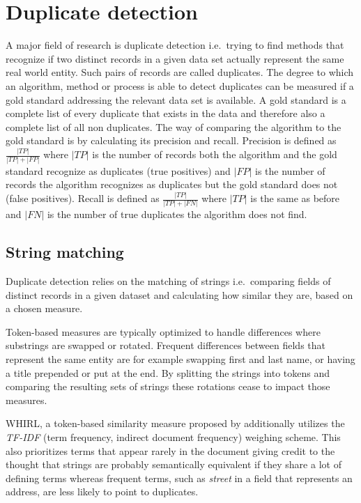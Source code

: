 \documentclass[conference]{IEEEtran}
\begin{document}
\section{Duplicate detection}\label{basics}
A major field of research is duplicate detection i.e.\ trying to find methods that recognize if two distinct records in a given data set actually represent the same real world entity. Such pairs of records are called duplicates. The degree to which an algorithm, method or process is able to detect duplicates can be measured if a gold standard addressing the relevant data set is available. A gold standard is a complete list of every duplicate that exists in the data and therefore also a complete list of all non duplicates.
The way of comparing the algorithm to the gold standard is by calculating its precision and recall. Precision is defined as $\frac{|TP|}{|TP|+|FP|}$ where $|TP|$ is the number of records both the algorithm and the gold standard recognize as duplicates (true positives) and $|FP|$ is the number of records the algorithm recognizes as duplicates but the gold standard does not (false positives). Recall is defined as $\frac{|TP|}{|TP|+|FN|}$ where $|TP|$ is the same as before and $|FN|$ is the number of true duplicates the algorithm does not find.

\subsection{String matching}
Duplicate detection relies on the matching of strings i.e.\ comparing fields of distinct records in a given dataset and calculating how similar they are, based on a chosen measure.

Token-based measures are typically optimized to handle differences where substrings are swapped or rotated. Frequent differences between fields that represent the same entity are for example swapping first and last name, or having a title prepended or put at the end. By splitting the strings into tokens and comparing the resulting sets of strings these rotations cease to impact those measures.

WHIRL, a token-based similarity measure proposed by \cite{Cohen.1998} additionally utilizes the \emph{TF-IDF} (term frequency, indirect document frequency) weighing scheme. This also prioritizes terms that appear rarely in the document giving credit to the thought that strings are probably semantically equivalent if they share a lot of defining terms whereas frequent terms, such as \emph{street} in a field that represents an address, are less likely to point to duplicates.
\end{document}

